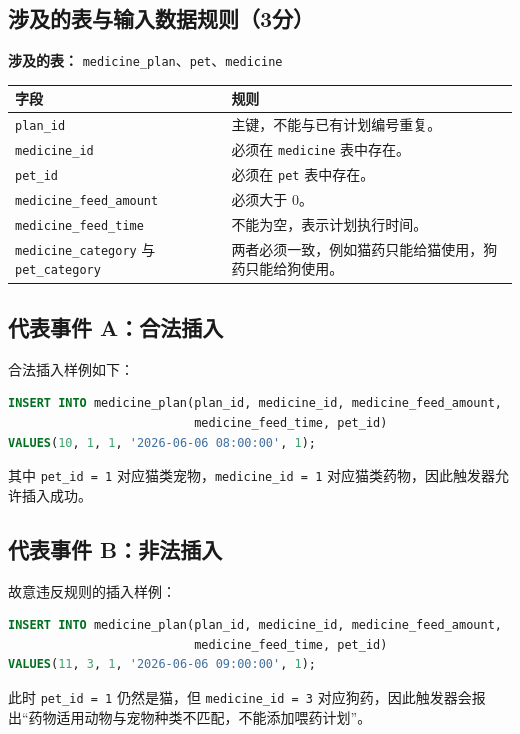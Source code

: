 \documentclass[12pt,a4paper,fontset=none]{ctexart}
\begin{document}
\subsection{涉及的表与输入数据规则（3分）}
\textbf{涉及的表：} \texttt{medicine\_plan}、\texttt{pet}、\texttt{medicine}

{\scriptsize
\begin{tabularx}{\linewidth}{|>{\centering\arraybackslash}p{4cm}|Y|}
\hline
字段 & 规则 \\
\hline
\texttt{plan\_id} & 主键，不能与已有计划编号重复。 \\
\hline
\texttt{medicine\_id} & 必须在 \texttt{medicine} 表中存在。 \\
\hline
\texttt{pet\_id} & 必须在 \texttt{pet} 表中存在。 \\
\hline
\texttt{medicine\_feed\_amount} & 必须大于 0。 \\
\hline
\texttt{medicine\_feed\_time} & 不能为空，表示计划执行时间。 \\
\hline
\texttt{medicine\_category} 与 \texttt{pet\_category} & 两者必须一致，例如猫药只能给猫使用，狗药只能给狗使用。 \\
\hline
\end{tabularx}
}

\subsection{代表事件 A：合法插入}
合法插入样例如下：
\begin{lstlisting}[language=SQL]
INSERT INTO medicine_plan(plan_id, medicine_id, medicine_feed_amount,
                          medicine_feed_time, pet_id)
VALUES(10, 1, 1, '2026-06-06 08:00:00', 1);
\end{lstlisting}
其中 \texttt{pet\_id = 1} 对应猫类宠物，\texttt{medicine\_id = 1} 对应猫类药物，因此触发器允许插入成功。

\subsection{代表事件 B：非法插入}
故意违反规则的插入样例：
\begin{lstlisting}[language=SQL]
INSERT INTO medicine_plan(plan_id, medicine_id, medicine_feed_amount,
                          medicine_feed_time, pet_id)
VALUES(11, 3, 1, '2026-06-06 09:00:00', 1);
\end{lstlisting}
此时 \texttt{pet\_id = 1} 仍然是猫，但 \texttt{medicine\_id = 3} 对应狗药，因此触发器会报出“药物适用动物与宠物种类不匹配，不能添加喂药计划”。
\end{document}
